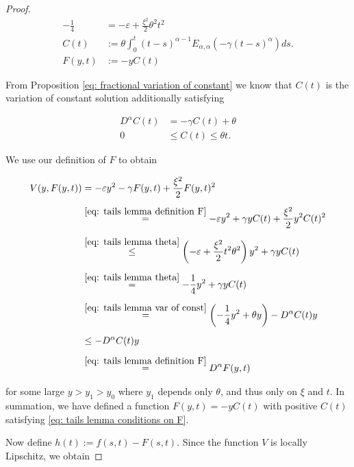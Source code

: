 \documentclass[12pt,twoside]{article}
\theoremstyle{plain}
\theoremstyle{plain}
\theoremstyle{definition}
\theoremstyle{remark}
\numberwithin{equation}{section}
\begin{document}
\begin{proof}
\begin{align}
-\frac 14 &= -\varepsilon + \frac{\xi ^2}{2} \theta^2t^2 \label{eq: tails lemma theta} \\[5pt]
C(t) &:= \theta\int_{0}^{t}(t-s)^{\alpha-1} E_{\alpha, \alpha}\left(-\gamma(t-s)^{\alpha}\right) ds. \\[5pt]
F(y, t)&:= -y C(t) \label{eq: tails lemma definition F}
\end{align}

From Proposition \ref{eq: fractional variation of constant} we know that $C(t)$ is the variation of constant solution additionally satisfying

\begin{align}
D^\alpha C(t) &= -\gamma C(t) + \theta \label{eq: tails lemma var of const} \\[10pt]
0&\leq C(t)\leq \theta t \label{eq: tails lemma Ct}.
\end{align}

We use our definition of $F$ to obtain

$$
\begin{aligned}
V(y, F(y, t)) &= - \varepsilon y^2 -\gamma F(y, t)+\frac{\xi^{2}}{2} F(y, t)^{2} \\[5pt]
&\overset{\eqref{eq: tails lemma definition F}}{=} - \varepsilon y^2 +\gamma yC(t)+\frac{\xi^{2}}{2} y^2C(t)^2 \\[5pt]
&\overset{\eqref{eq: tails lemma theta}}{\leq} \left(- \varepsilon +\frac{\xi^{2}}{2}  t^2\theta^2\right)y^2 +\gamma yC(t) \\[5pt]
&\overset{\eqref{eq: tails lemma theta}}{=} -\frac 14 y^2 +\gamma yC(t) \\[5pt]
&\overset{\eqref{eq: tails lemma var of const}}{=} \left(-\frac 14 y^2 + \theta y \right) - D^\alpha C(t)y \\[5pt]
&\leq -D^\alpha C(t) y \\[5pt]
&\overset{\eqref{eq: tails lemma definition F}}{=} D^\alpha F(y,t)
\end{aligned}
$$

\vspace{5pt}

for some large $y>y_1>y_0$ where $y_1$ depends only $\theta$, and thus only on $\xi$ and $t$. In summation, we have defined a function $F(y,t) = -y C(t)$ with positive $C(t)$ satisfying \eqref{eq: tails lemma conditions on F}.

Now define $h(t) := f(s,t) - F(s,t)$. Since the function $V$ is locally Lipschitz, we obtain


\end{proof}
\end{document}
